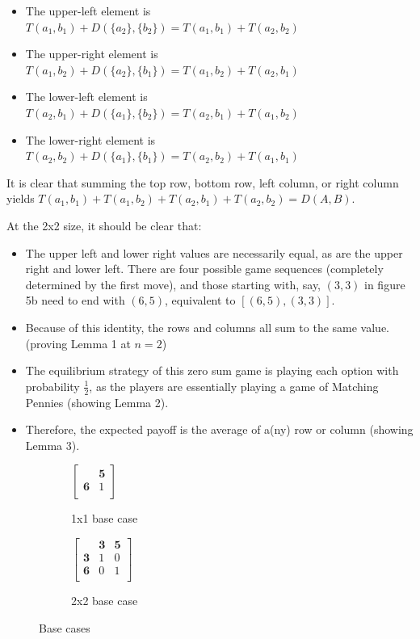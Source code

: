 \documentclass[11pt, oneside]{article} 	%
\begin{document}
\begin{itemize}
\item The upper-left element is $T(a_1, b_1) + D(\{a_2\}, \{b_2\}) = T(a_1, b_1) + T(a_2, b_2)$
\item The upper-right element is $T(a_1, b_2) + D(\{a_2\}, \{b_1\}) = T(a_1, b_2) + T(a_2, b_1)$
\item The lower-left element is $T(a_2, b_1) + D(\{a_1\}, \{b_2\}) = T(a_2, b_1) + T(a_1, b_2)$
\item The lower-right element is $T(a_2, b_2) + D(\{a_1\}, \{b_1\}) = T(a_2, b_2) + T(a_1, b_1)$
\end{itemize}

It is clear that summing the top row, bottom row, left column, or right column yields $T(a_1, b_1) + T(a_1, b_2) + T(a_2, b_1) + T(a_2, b_2) = D(A,B)$. 

At the 2x2 size, it should be clear that:
\begin{itemize}
\item The upper left and lower right values are necessarily equal, as are the upper right and lower left. There are four possible game sequences (completely determined by the first move), and those starting with, say, $(3,3)$ in figure 5b need to end with $(6,5)$, equivalent to $[(6,5), (3,3)]$.
\item Because of this identity, the rows and columns all sum to the same value. (proving Lemma 1 at $n=2$)
\item The equilibrium strategy of this zero sum game is playing each option with probability $\frac{1}{2}$, as the players are essentially playing a game of Matching Pennies\cite{1} (showing Lemma 2).
\item Therefore, the expected payoff is the average of a(ny) row or column (showing Lemma 3).
\end{itemize}



\begin{figure}
\centering
\begin{subfigure}{.5\textwidth}
 \centering
 

$ \left[\begin{array}{cc}
            & \mathbf{5}\\ 
            \mathbf{6} & 1\\
           \end{array}\right] 
$

 \caption{1x1 base case}
\label{fig:basecase_1x1}
\end{subfigure}
\begin{subfigure}{.5\textwidth}
 \centering

$ \left[\begin{array}{ccc}
            & \mathbf{3} & \mathbf{5}\\ 
            \mathbf{3} & 1 & 0\\
            \mathbf{6} & 0 & 1\\
           \end{array}\right] 
$
 \caption{2x2 base case}
\label{fig:basecase_1x1}
\end{subfigure}
\caption{Base cases}
\label{fig:base}
\end{figure}
\end{document}
